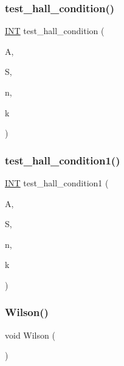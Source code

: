 \subsubsection{\texorpdfstring{test\+\_\+hall\+\_\+condition()}{test\_hall\_condition()}}
{\footnotesize\ttfamily \mbox{\hyperlink{galois_8h_a09fddde158a3a20bd2dcadb609de11dc}{I\+NT}} test\+\_\+hall\+\_\+condition (\begin{DoxyParamCaption}\item[{\mbox{\hyperlink{classmatrix}{matrix}} \&}]{A,  }\item[{\mbox{\hyperlink{class_vector}{Vector}} \&}]{S,  }\item[{\mbox{\hyperlink{galois_8h_a09fddde158a3a20bd2dcadb609de11dc}{I\+NT}}}]{n,  }\item[{\mbox{\hyperlink{galois_8h_a09fddde158a3a20bd2dcadb609de11dc}{I\+NT}} \&}]{k }\end{DoxyParamCaption})}

\mbox{\label{test_8_c_a10e89b9a02e269d087b5f88777abf624}} 
\subsubsection{\texorpdfstring{test\+\_\+hall\+\_\+condition1()}{test\_hall\_condition1()}}
{\footnotesize\ttfamily \mbox{\hyperlink{galois_8h_a09fddde158a3a20bd2dcadb609de11dc}{I\+NT}} test\+\_\+hall\+\_\+condition1 (\begin{DoxyParamCaption}\item[{\mbox{\hyperlink{classmatrix}{matrix}} \&}]{A,  }\item[{\mbox{\hyperlink{class_vector}{Vector}} \&}]{S,  }\item[{\mbox{\hyperlink{galois_8h_a09fddde158a3a20bd2dcadb609de11dc}{I\+NT}}}]{n,  }\item[{\mbox{\hyperlink{galois_8h_a09fddde158a3a20bd2dcadb609de11dc}{I\+NT}}}]{k }\end{DoxyParamCaption})}

\mbox{\label{test_8_c_a74d70c4515ad1bfa1f5dfd97aee72491}} 
\subsubsection{\texorpdfstring{Wilson()}{Wilson()}}
{\footnotesize\ttfamily void Wilson (\begin{DoxyParamCaption}{ }\end{DoxyParamCaption})}



